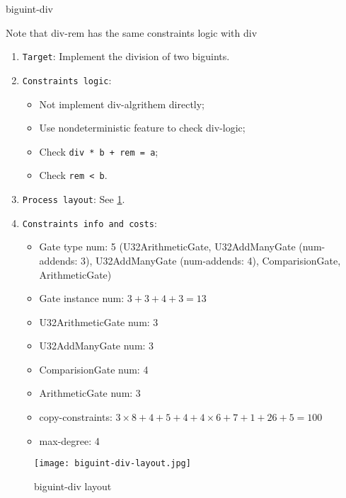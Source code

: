 {biguint-div}
\hspace*{\fill}

Note that div-rem has the same constraints logic with div

\begin{enumerate}
    \item \verb|Target|: Implement the division of two biguints.
    \item \verb|Constraints logic|:
    \begin{itemize}
        \item Not implement div-algrithem directly;
        \item Use nondeterministic feature to check div-logic;
        \item Check \verb|div * b + rem = a|;
        \item Check \verb|rem < b|.
    \end{itemize}
    \item \verb|Process layout|: See \ref{fig:biguint-div-layout}.
    \item \verb|Constraints info and costs|:
    \begin{itemize}
        \item Gate type num: 5 (U32ArithmeticGate, U32AddManyGate (num-addends: 3), U32AddManyGate (num-addends: 4), ComparisionGate, ArithmeticGate)
        \item Gate instance num: $3 + 3 + 4 + 3 = 13$
        \item U32ArithmeticGate num: 3
        \item U32AddManyGate num: 3
        \item ComparisionGate num: 4
        \item ArithmeticGate num: 3
        \item copy-constraints: $3 \times 8 + 4 + 5 + 4 + 4 \times 6 + 7 + 1 + 26 + 5 = 100$
        \item max-degree: 4
    \end{itemize}
\end{enumerate}

\begin{figure}[!ht]
    \centering
    \texttt{[image: biguint-div-layout.jpg]}
    \caption{biguint-div layout}
    \label{fig:biguint-div-layout}
\end{figure}